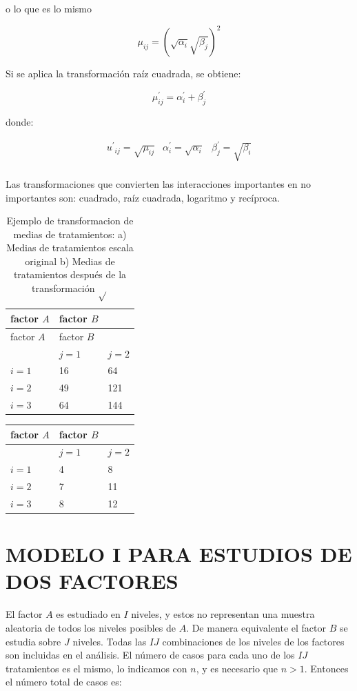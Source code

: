 \documentclass[]{book}
\theoremstyle{definition}
\theoremstyle{definition}
\theoremstyle{definition}
\theoremstyle{remark}
\begin{document}
o lo que es lo mismo

\[
\mu_{ij} = \left( \sqrt{\alpha_{i}}\sqrt{\beta_{j}} \right)^{2}
\]

Si se aplica la transformación raíz cuadrada, se obtiene:

\[
\mu_{ij}^{'} = \alpha_{i}^{'} + \beta_{j}^{'}
\]

donde:

\[
\begin{matrix}
{u^{'}}_{ij} = \sqrt{\mu_{ij}} & \alpha_{i}^{'} = \sqrt{\alpha_{i}} & \beta_{j}^{'} = \sqrt{\beta_{i}} \\
\end{matrix}
\]

Las transformaciones que convierten las interacciones importantes en no
importantes son: cuadrado, raíz cuadrada, logaritmo y recíproca.

\begin{longtable}[]{@{}lll@{}}
\caption{\label{tab:ejemplo-transformaciones} Ejemplo de transformacion de
medias de tratamientos: a) Medias de tratamientos escala original b)
Medias de tratamientos después de la transformación
\(\sqrt{}\)}\tabularnewline
\toprule
factor \(A\) & factor \(B\) &\tabularnewline
\midrule
\endfirsthead
\toprule
factor \(A\) & factor \(B\) &\tabularnewline
\midrule
\endhead
& \(j = 1\) & \(j = 2\)\tabularnewline
\(i = 1\) & 16 & 64\tabularnewline
\(i = 2\) & 49 & 121\tabularnewline
\(i = 3\) & 64 & 144\tabularnewline
\bottomrule
\end{longtable}

\begin{longtable}[]{@{}lll@{}}
\toprule
factor \(A\) & factor \(B\) &\tabularnewline
\midrule
\endhead
& \(j = 1\) & \(j = 2\)\tabularnewline
\(i = 1\) & 4 & 8\tabularnewline
\(i = 2\) & 7 & 11\tabularnewline
\(i = 3\) & 8 & 12\tabularnewline
\bottomrule
\end{longtable}

\hypertarget{modelo-i-para-estudios-de-dos-factores}{%
\section{MODELO I PARA ESTUDIOS DE DOS
FACTORES}\label{modelo-i-para-estudios-de-dos-factores}}

El factor \(A\) es estudiado en \(I\) niveles, y estos no representan
una muestra aleatoria de todos los niveles posibles de \(A\). De manera
equivalente el factor \(B\) se estudia sobre \(J\) niveles. Todas las
\(IJ\) combinaciones de los niveles de los factores son incluidas en el
análisis. El número de casos para cada uno de los \(IJ\) tratamientos es
el mismo, lo indicamos con \(n\), y es necesario que \(n > 1\). Entonces
el número total de casos es:
\end{document}
